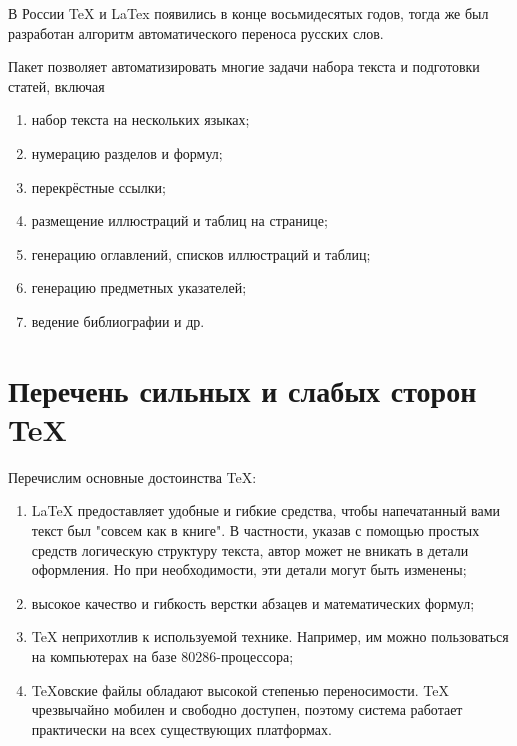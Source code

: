 \documentclass[a4paper,14pt]{report} %
\begin{document}
\par
В России TeX и LaTex появились в конце восьмидесятых годов, тогда же был разработан алгоритм автоматического переноса русских слов. 
\par
Пакет позволяет автоматизировать многие задачи набора текста и подготовки статей, включая
\begin{enumerate} %
\item набор текста на нескольких языках;
\item нумерацию разделов и формул;
\item перекрёстные ссылки;
\item размещение иллюстраций и таблиц на странице;
\item генерацию оглавлений, списков иллюстраций и таблиц;
\item генерацию предметных указателей;
\item ведение библиографии и др.
\end{enumerate}

\section{Перечень сильных и слабых сторон TeX}
Перечислим основные достоинства TeX:
\begin{enumerate} %
\item LaTeX предоставляет удобные и гибкие средства, чтобы напечатанный вами текст был "совсем как в книге". В частности, указав с помощью простых средств логическую структуру текста, автор может не вникать в детали оформления. Но при необходимости, эти детали могут быть изменены;
\item высокое качество и гибкость верстки абзацев и математических формул;
\item TeX неприхотлив к используемой технике. Например, им можно пользоваться на компьютерах на базе 80286-процессора;
\item TeXовские файлы обладают высокой степенью переносимости. TeX чрезвычайно мобилен и свободно доступен, поэтому система работает практически на всех существующих платформах.
\end{enumerate}
\end{document}
